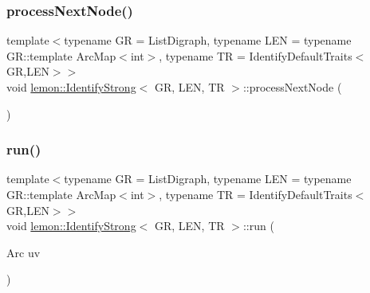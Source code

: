 \mbox{\label{classlemon_1_1_identify_strong_aaf7dd46356fb66261d5d48c3f840978e}} 
\subsubsection{\texorpdfstring{process\+Next\+Node()}{processNextNode()}}
{\footnotesize\ttfamily template$<$typename GR  = List\+Digraph, typename L\+EN  = typename G\+R\+::template Arc\+Map$<$int$>$, typename TR  = Identify\+Default\+Traits$<$\+G\+R,\+L\+E\+N$>$$>$ \\
void \hyperlink{classlemon_1_1_identify_strong}{lemon\+::\+Identify\+Strong}$<$ GR, L\+EN, TR $>$\+::process\+Next\+Node (\begin{DoxyParamCaption}{ }\end{DoxyParamCaption})\hspace{0.3cm}{\ttfamily [inline]}}

\mbox{\label{classlemon_1_1_identify_strong_ae54664c75b5d3be960806bfe5bb3db98}} 
\subsubsection{\texorpdfstring{run()}{run()}}
{\footnotesize\ttfamily template$<$typename GR  = List\+Digraph, typename L\+EN  = typename G\+R\+::template Arc\+Map$<$int$>$, typename TR  = Identify\+Default\+Traits$<$\+G\+R,\+L\+E\+N$>$$>$ \\
void \hyperlink{classlemon_1_1_identify_strong}{lemon\+::\+Identify\+Strong}$<$ GR, L\+EN, TR $>$\+::run (\begin{DoxyParamCaption}\item[{Arc}]{uv }\end{DoxyParamCaption})\hspace{0.3cm}{\ttfamily [inline]}}

\mbox{\label{classlemon_1_1_identify_strong_a5ddb1c6472742727d7119c912193c768}} 

